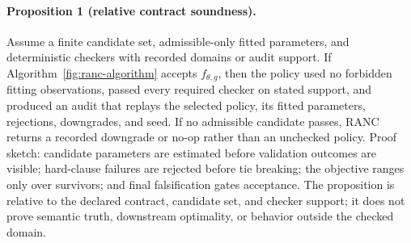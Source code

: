 \documentclass{article}
\begin{document}
\begin{table}[t]
\centering
\scriptsize
\setlength{\tabcolsep}{5pt}
\renewcommand{\arraystretch}{0.82}
\caption{Contract clauses map directly to compiler behavior and falsification evidence.}
\label{tab:contract-evidence}
\end{table}

\paragraph{Proposition 1 (relative contract soundness).}
Assume a finite candidate set, admissible-only fitted parameters, and
deterministic checkers with recorded domains or audit support. If
Algorithm~\ref{fig:ranc-algorithm} accepts $f_{\theta,g}$, then the policy used
no forbidden fitting observations, passed every required checker on stated
support, and produced an audit that replays the selected policy, its fitted
parameters, rejections, downgrades, and seed. If no admissible candidate passes,
RANC returns a recorded downgrade or no-op rather than an unchecked policy.
Proof sketch: candidate parameters are estimated before validation outcomes are
visible; hard-clause failures are rejected before tie breaking; the objective
ranges only over survivors; and final falsification gates acceptance. The
proposition is relative to the declared contract, candidate set, and checker
support; it does not prove semantic truth, downstream optimality, or behavior
outside the checked domain.
\end{document}
